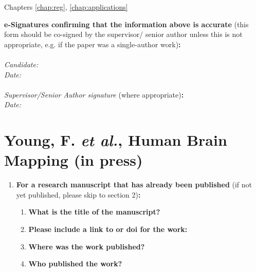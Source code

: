 {\begin{enumerate}[leftmargin=*,label={\bfseries\arabic*.}]
	Chapters \ref{chap:reg}, \ref{chap:applications}

	\end{enumerate}

	\textbf{e-Signatures confirming that the information above is accurate}
	(this form should be co-signed by the supervisor/ senior author unless this is not appropriate, e.g. if the paper was a single-author work)\textbf{:}\\
	\\[\baselineskip]
	\textit{Candidate:}
	\\[\baselineskip]
	\textit{Date:}\\\signdate
	\\[\baselineskip]
	\textit{Supervisor/Senior Author signature} (where appropriate)\textbf{:}
	\\[\baselineskip]
	\textit{Date:}\\\signdate


\section*{Young, F. \textit{et al.}, Human Brain Mapping (in press)}
	\begin{enumerate}[leftmargin=*,label={\bfseries\arabic*.}]\itemsep0em
	\item \textbf{For a research manuscript that has already been published} (if not yet published, please skip to section 2)\textbf{:}
	\begin{enumerate}[label={\alph*)}]\itemsep0em
		\item \textbf{What is the title of the manuscript?}


		\item \textbf{Please include a link to or doi for the work:}


		\item \textbf{Where was the work published?}


		\item \textbf{Who published the work?}



\end{enumerate}
\end{enumerate}}

